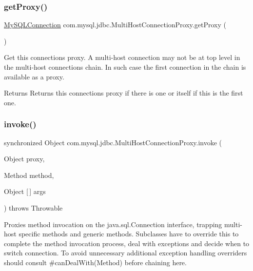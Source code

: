 \subsubsection{\texorpdfstring{get\+Proxy()}{getProxy()}}
{\footnotesize\ttfamily \mbox{\hyperlink{interfacecom_1_1mysql_1_1jdbc_1_1_my_s_q_l_connection}{My\+S\+Q\+L\+Connection}} com.\+mysql.\+jdbc.\+Multi\+Host\+Connection\+Proxy.\+get\+Proxy (\begin{DoxyParamCaption}{ }\end{DoxyParamCaption})\hspace{0.3cm}{\ttfamily [protected]}}

Get this connection\textquotesingle{}s proxy. A multi-\/host connection may not be at top level in the multi-\/host connections chain. In such case the first connection in the chain is available as a proxy.

\begin{DoxyReturn}{Returns}
Returns this connection\textquotesingle{}s proxy if there is one or itself if this is the first one. 
\end{DoxyReturn}
\mbox{\label{classcom_1_1mysql_1_1jdbc_1_1_multi_host_connection_proxy_a9b04a3d31a24703df3ace35e18c02874}} 
\subsubsection{\texorpdfstring{invoke()}{invoke()}}
{\footnotesize\ttfamily synchronized Object com.\+mysql.\+jdbc.\+Multi\+Host\+Connection\+Proxy.\+invoke (\begin{DoxyParamCaption}\item[{Object}]{proxy,  }\item[{Method}]{method,  }\item[{Object \mbox{[}$\,$\mbox{]}}]{args }\end{DoxyParamCaption}) throws Throwable}

Proxies method invocation on the java.\+sql.\+Connection interface, trapping multi-\/host specific methods and generic methods. Subclasses have to override this to complete the method invocation process, deal with exceptions and decide when to switch connection. To avoid unnecessary additional exception handling overriders should consult \#can\+Deal\+With(\+Method) before chaining here. \mbox{\label{classcom_1_1mysql_1_1jdbc_1_1_multi_host_connection_proxy_aa6770753b8f86d1d0680e1f97924c64c}} 
